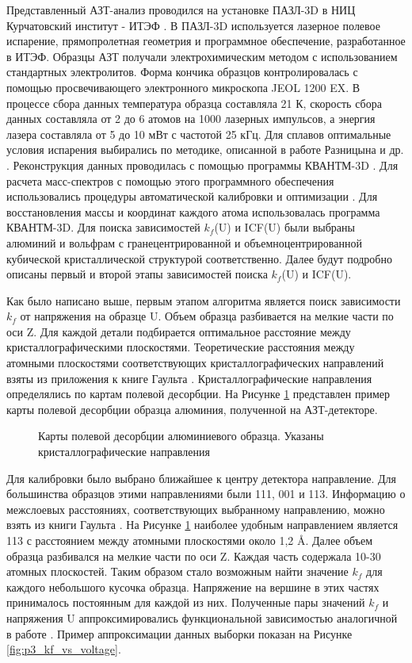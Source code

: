 Представленный АЗТ-анализ проводился на установке ПАЗЛ-3D в НИЦ Курчатовский институт - ИТЭФ \cite{scbibAPPLE}. В ПАЗЛ-3D используется лазерное полевое испарение, прямопролетная геометрия и программное обеспечение, разработанное в ИТЭФ. Образцы АЗТ получали электрохимическим методом с использованием стандартных электролитов. Форма кончика образцов контролировалась с помощью просвечивающего электронного микроскопа JEOL 1200 EX. В процессе сбора данных температура образца составляла 21 К, скорость сбора данных составляла от 2 до 6 атомов на 1000 лазерных импульсов, а энергия лазера составляла от 5 до 10 мВт с частотой 25 кГц. Для сплавов оптимальные условия испарения выбирались по методике, описанной в работе Разницына и др. \cite{scbibOptParamsYAFI}. Реконструкция данных проводилась с помощью программы КВАНТМ-3D \cite{KVANTM}. Для расчета масс-спектров с помощью этого программного обеспечения использовались процедуры автоматической калибровки и оптимизации \cite{Shutov19}.
Для восстановления массы и координат каждого атома использовалась программа КВАНТМ-3D. Для поиска зависимостей $k_f$(U) и ICF(U) были выбраны алюминий и вольфрам с гранецентрированной и объемноцентрированной кубической кристаллической структурой соответственно. Далее будут подробно описаны первый и второй этапы зависимостей поиска $k_f$(U) и ICF(U).

Как было написано выше, первым этапом алгоритма является поиск зависимости $k_f$ от напряжения на образце U. Объем образца разбивается на мелкие части по оси Z. Для каждой детали подбирается оптимальное расстояние между кристаллографическими плоскостями. Теоретические расстояния между атомными плоскостями соответствующих кристаллографических направлений взяты из приложения к книге Гаульта \cite{GaultBOOK}. Кристаллографические направления определялись по картам полевой десорбции. На Рисунке \cref{fig:p3_Alion} представлен пример карты полевой десорбции образца алюминия, полученной на АЗТ-детекторе.

\begin{figure}[htb]
	\caption{Карты полевой десорбции алюминиевого образца. Указаны кристаллографические направления}
	\label{fig:p3_Alion}
\end{figure} 

Для калибровки было выбрано ближайшее к центру детектора направление. Для большинства образцов этими направлениями были {111}, {001} и {113}. Информацию о межслоевых расстояниях, соответствующих выбранному направлению, можно взять из книги Гаульта \cite{GaultBOOK}. На Рисунке \cref{fig:p3_Alion} наиболее удобным направлением является {113} с расстоянием между атомными плоскостями около 1,2 \r{A}. Далее объем образца разбивался на мелкие части по оси Z. Каждая часть содержала 10-30 атомных плоскостей. Таким образом стало возможным найти значение $k_f$ для каждого небольшого кусочка образца. Напряжение на вершине в этих частях принималось постоянным для каждой из них. Полученные пары значений $k_f$ и напряжения U аппроксимировались функциональной зависимостью аналогичной в работе \cite{Hatzoglou19}. Пример аппроксимации данных выборки показан на Рисунке \cref{fig:p3_kf_vs_voltage}.


